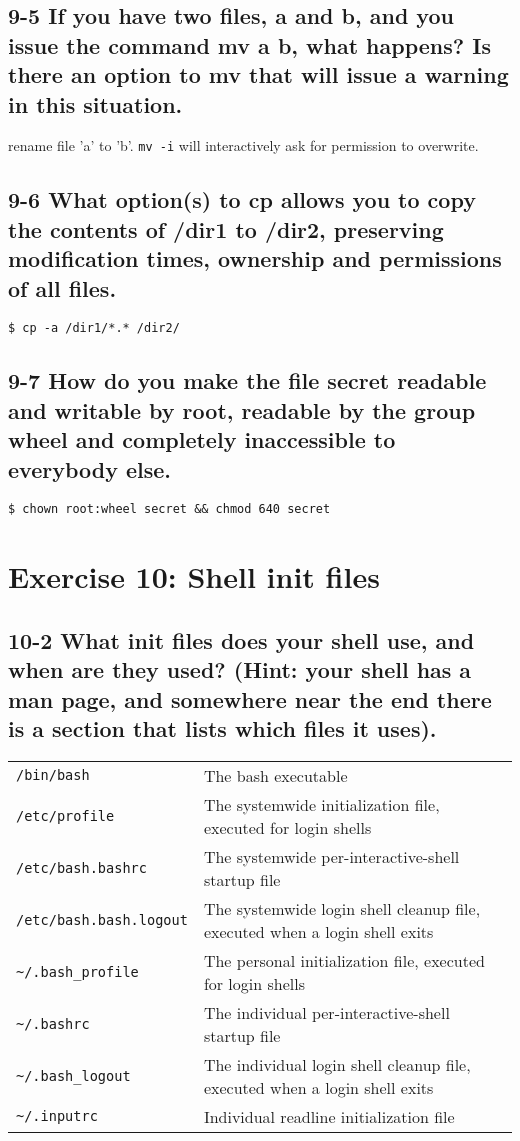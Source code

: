 \subsection{9-5 If you have two files, a and b, and you issue the command mv a b, what happens? Is there an option to mv that will issue a warning in this situation.}
rename file 'a' to 'b'. \verb=mv -i= will interactively ask for permission to overwrite.

\subsection{9-6 What option(s) to cp allows you to copy the contents of /dir1 to /dir2, preserving modification times, ownership and permissions of all files.}
\verb=$ cp -a /dir1/*.* /dir2/=

\subsection{9-7 How do you make the file secret readable and writable by root, readable by the group wheel and completely inaccessible to everybody else.}
\verb=$ chown root:wheel secret && chmod 640 secret=

\section{Exercise 10: Shell init files}
\subsection{10-2 What init files does your shell use, and when are they used? (Hint: your shell has a man page, and somewhere near the end there is a section that lists which files it uses).}

\begin{tabular}{ll}
\verb=/bin/bash= &
	The bash executable\\
\verb=/etc/profile= &
	The systemwide initialization file, executed for login shells\\
\verb=/etc/bash.bashrc= &
	The systemwide per-interactive-shell startup file\\
\verb=/etc/bash.bash.logout= &
	The systemwide login shell cleanup file, executed when a login shell exits\\
\verb=~/.bash_profile= &
	The personal initialization file, executed for login shells\\
\verb=~/.bashrc= &
	The individual per-interactive-shell startup file\\
\verb=~/.bash_logout= &
	The individual login shell cleanup file, executed when a login shell exits\\
\verb=~/.inputrc=&
	Individual readline initialization file
\end{tabular}

